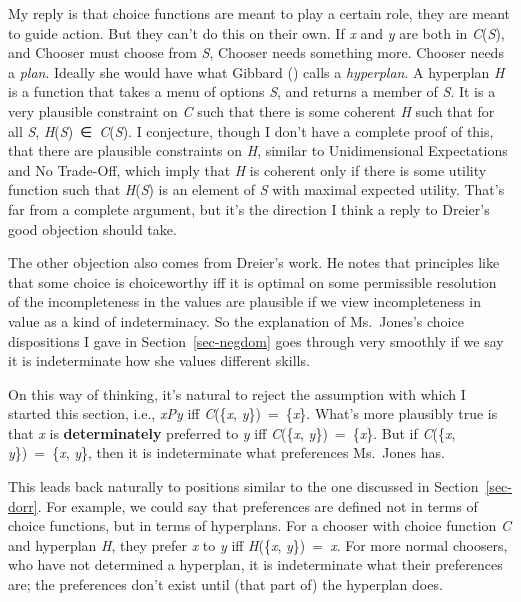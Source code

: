 \documentclass[
  10.5pt,
  twoside]{article}
\begin{document}
My reply is that choice functions are meant to play a certain role, they
are meant to guide action. But they can't do this on their own. If
\emph{x} and \emph{y} are both in \emph{C}(\emph{S}), and Chooser must
choose from \emph{S}, Chooser needs something more. Chooser needs a
\emph{plan}. Ideally she would have what Gibbard
() calls a \emph{hyperplan}. A hyperplan
\emph{H} is a function that takes a menu of options \emph{S}, and
returns a member of \emph{S}. It is a very plausible constraint on
\emph{C} such that there is some coherent \emph{H} such that for all
\emph{S}, \emph{H}(\emph{S})~∈~\emph{C}(\emph{S}). I conjecture, though
I don't have a complete proof of this, that there are plausible
constraints on \emph{H}, similar to Unidimensional Expectations and No
Trade-Off, which imply that \emph{H} is coherent only if there is some
utility function such that \emph{H}(\emph{S}) is an element of \emph{S}
with maximal expected utility. That's far from a complete argument, but
it's the direction I think a reply to Dreier's good objection should
take.

The other objection also comes from Dreier's work. He notes that
principles like that some choice is choiceworthy iff it is optimal on
some permissible resolution of the incompleteness in the values are
plausible if we view incompleteness in value as a kind of indeterminacy.
So the explanation of Ms.~Jones's choice dispositions I gave in
Section~\ref{sec-negdom} goes through very smoothly if we say it is
indeterminate how she values different skills.

On this way of thinking, it's natural to reject the assumption with
which I started this section, i.e., \emph{xPy} iff \emph{C}(\{\emph{x},
\emph{y}\})~=~\{\emph{x}\}. What's more plausibly true is that \emph{x}
is \textbf{determinately} preferred to \emph{y} iff \emph{C}(\{\emph{x},
\emph{y}\})~=~\{\emph{x}\}. But if \emph{C}(\{\emph{x},
\emph{y}\})~=~\{\emph{x}, \emph{y}\}, then it is indeterminate what
preferences Ms.~Jones has.

This leads back naturally to positions similar to the one discussed in
Section~\ref{sec-dorr}. For example, we could say that preferences are
defined not in terms of choice functions, but in terms of hyperplans.
For a chooser with choice function \emph{C} and hyperplan \emph{H}, they
prefer \emph{x} to \emph{y} iff \emph{H}(\{\emph{x},
\emph{y}\})~=~\emph{x}. For more normal choosers, who have not
determined a hyperplan, it is indeterminate what their preferences are;
the preferences don't exist until (that part of) the hyperplan does.
\end{document}
